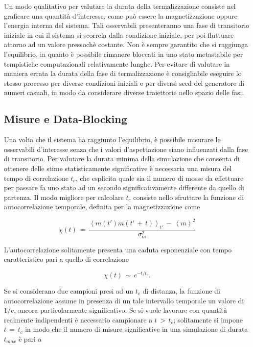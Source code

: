 Un modo qualitativo per valutare la durata della termalizzazione consiste nel graficare una quantità d'interesse, 
come può essere la magnetizzazione oppure l'energia interna del sistema. Tali osservabili presenteranno una fase di transitorio 
iniziale in cui il sistema si scorrela dalla condizione iniziale, per poi fluttuare attorno ad un valore pressochè costante. Non è 
sempre garantito che si raggiunga l'equilibrio, in quanto è possibile rimanere bloccati in uno stato metastabile per tempistiche 
computazionali relativamente lunghe. Per evitare di valutare in maniera errata la durata della fase di termalizzazione è consigliabile 
eseguire lo stesso processo per diverse condizioni iniziali e per diversi seed del generatore di numeri casuali, in modo da considerare 
diverse traiettorie nello spazio delle fasi.  




\subsection{Misure e Data-Blocking}

Una volta che il sistema ha raggiunto l'equilibrio, è possibile misurare le osservabili d'interesse senza che i valori d'aspettazione 
siano influenzati dalla fase di transitorio. Per valutare la durata minima della simulazione che consenta di ottenere delle stime 
statisticamente significative è necessaria una misura del tempo di correlazione $t_c$, che esplicita quale sia il numero di mosse 
da effettuare per passare fa uno stato ad un secondo significativamente differente da quello di partenza. Il modo migliore per 
calcolare $t_c$ consiste nello sfruttare la funzione di autocorrelazione temporale, definita per la magnetizzazione come 

\begin{equation}
    \chi\left(t\right)\,=\,\frac{\left<m\left(t'\right)m\left(t'\,+\,t\right)\right>_{t'}\,-\,\left<m\right>^2}{\sigma^2_m}
    \label{eq: auto_corr_m}
\end{equation}

L'autocorrelazione solitamente presenta una caduta esponenziale con tempo caratteristico pari a quello di correlazione

\begin{equation}
    \chi\left(t\right)\,\sim\,e^{-t/t_c}.
    \label{eq: auto_corr_cad_exp}
\end{equation}

Se si considerano due campioni presi ad un $t_c$ di distanza, la funzione di autocorrelazione assume in presenza di un tale 
intervallo temporale un valore di $1/e$, ancora particolarmente significativo. Se si vuole lavorare con quantità realmente indipendenti 
è necessario campionare a $t\,>\,t_c$; solitamente si impone $t\,=\,t_c$ in modo che il numero di misure significative in una 
simulazione di durata $t_{max}$ è pari a 

